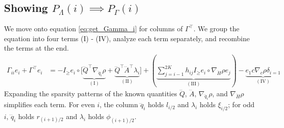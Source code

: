 \documentclass[a4paper,12pt]{article}
\theoremstyle{definition}
\begin{document}
\subsection{Showing $P_\Lambda(i) \!\!\implies P_\Gamma(i)$}
We move onto equation \eqref{eq:get_Gamma_i} for columns of $\Gamma^\top$. We group the equation into four terms (I) - (IV), analyze each term separately, and recombine the terms at the end.
\begin{align}
    \Gamma_{ii}e_i + \Gamma^\top e_i &= - I_\geq e_i \circ \bigg[\underbrace{\dddot{Q}^\top \nabla_{\dddot{q}_i} \rho}_{(\text{I})} + \underbrace{\dddot{Q}^\top \dddot{A}^\top \lambda_i}_{(\text{II})}\bigg] + \left(\underbrace{\sum_{j=i-1}^{2K} h_{ij} I_\geq e_i \circ \nabla_{\dddot{H}} \rho e_j}_{(\text{III})}\right) - \underbrace{e_1c\nabla_{c} \rho \delta_{i=1}}_{(\text{IV})}
\end{align}
Expanding the sparsity patterns of the known quantities $\dddot{Q}$, $\dddot{A}$, $\nabla_{\dddot{q}_i} \rho$, and $\nabla_{\dddot{H}} \rho$ simplifies each term. For even $i$, the column $\dddot{q}_i$ holds $l_{i/2}$ and $\lambda_i$ holds $\xi_{i/2}$; for odd $i$, $\dddot{q}_i$ holds $r_{(i+1)/2}$ and $\lambda_i$ holds $\phi_{(i+1)/2}$.
\end{document}
